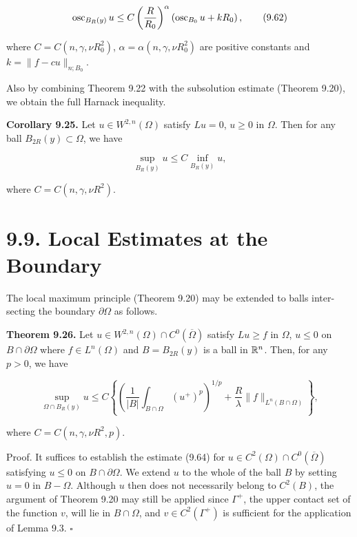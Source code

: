 \begin{equation}
\operatorname{osc}_{B_R(y)} u \leq C \left(\frac{R}{R_0}\right)^{\alpha} \left(\operatorname{osc}_{B_0} u + kR_0\right),
\tag{9.62}
\end{equation}

where $C = C(n,\gamma,\nu R_0^2)$, $\alpha = \alpha(n,\gamma,\nu R_0^2)$ are positive constants and
$k = \|f - cu\|_{n;B_0}$.

Also by combining Theorem 9.22 with the subsolution estimate (Theorem 9.20),
we obtain the full Harnack inequality.

\noindent\textbf{Corollary 9.25.} \quad Let $u \in W^{2,n}(\Omega)$ satisfy $Lu = 0$, $u \geq 0$ in $\Omega$. Then for any ball
$B_{2R}(y) \subset \Omega$, we have

\begin{equation}
\sup_{B_R(y)} u \leq C \inf_{B_R(y)} u,
\tag{9.63}
\end{equation}

where $C = C(n,\gamma,\nu R^2)$.

\section*{9.9. Local Estimates at the Boundary}

The local maximum principle (Theorem 9.20) may be extended to balls inter-
secting the boundary $\partial\Omega$ as follows.

\noindent\textbf{Theorem 9.26.} \quad Let $u \in W^{2,n}(\Omega) \cap C^0(\overline{\Omega})$ satisfy $Lu \geq f$ in $\Omega$, $u \leq 0$ on $B \cap \partial\Omega$
where $f \in L^n(\Omega)$ and $B = B_{2R}(y)$ is a ball in $\mathbb{R}^n$. Then, for any $p > 0$, we have

\begin{equation}
\sup_{\Omega \cap B_R(y)} u \leq C \left\{\left(\frac{1}{|B|}\int_{B \cap \Omega}(u^+)^p\right)^{1/p}
+ \frac{R}{\lambda}\|f\|_{L^n(B \cap \Omega)}\right\},
\tag{9.64}
\end{equation}

where $C = C(n,\gamma,\nu R^2,p)$.

Proof. \quad It suffices to establish the estimate (9.64) for $u \in C^2(\Omega) \cap C^0(\overline{\Omega})$ satisfying
$u \leq 0$ on $B \cap \partial\Omega$. We extend $u$ to the whole of the ball $B$ by setting $u = 0$ in $B - \Omega$.
Although $u$ then does not necessarily belong to $C^2(B)$, the argument of Theorem
9.20 may still be applied since $\Gamma^+$, the upper contact set of the function $v$, will lie
in $B \cap \Omega$, and $v \in C^2(\Gamma^+)$ is sufficient for the application of Lemma 9.3. \hfill $\square$

